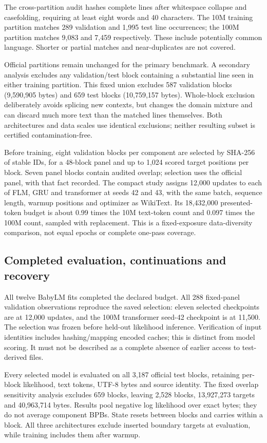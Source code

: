 \documentclass[10pt]{article}
\begin{document}
The cross-partition audit hashes complete lines after whitespace collapse and casefolding, requiring at least eight words and 40 characters. The 10M training partition matches 289 validation and 1,995 test line occurrences; the 100M partition matches 9,083 and 7,459 respectively. These include potentially common language. Shorter or partial matches and near-duplicates are not covered.

Official partitions remain unchanged for the primary benchmark. A secondary analysis excludes any validation/test block containing a substantial line seen in either training partition. This fixed union excludes 587 validation blocks (9,590,905 bytes) and 659 test blocks (10,759,157 bytes). Whole-block exclusion deliberately avoids splicing new contexts, but changes the domain mixture and can discard much more text than the matched lines themselves. Both architectures and data scales use identical exclusions; neither resulting subset is certified contamination-free.

Before training, eight validation blocks per component are selected by SHA-256 of stable IDs, for a 48-block panel and up to 1,024 scored target positions per block. Seven panel blocks contain audited overlap; selection uses the official panel, with that fact recorded. The compact study assigns 12,000 updates to each of FLM, GRU and transformer at seeds 42 and 43, with the same batch, sequence length, warmup positions and optimizer as WikiText. Its 18,432,000 presented-token budget is about 0.99 times the 10M text-token count and 0.097 times the 100M count, sampled with replacement. This is a fixed-exposure data-diversity comparison, not equal epochs or complete one-pass coverage.

\subsection{Completed evaluation, continuations and recovery}
All twelve BabyLM fits completed the declared budget. All 288 fixed-panel
validation observations reproduce the saved selection: eleven selected
checkpoints are at 12,000 updates, and the 100M transformer seed-42 checkpoint
is at 11,500. The selection was frozen before held-out likelihood inference.
Verification of input identities includes hashing/mapping encoded caches;
this is distinct from model scoring. It must not be described as a complete
absence of earlier access to test-derived files.

Every selected model is evaluated on all 3,187 official test blocks, retaining
per-block likelihood, text tokens, UTF-8 bytes and source identity. The fixed
overlap sensitivity analysis excludes 659 blocks, leaving 2,528 blocks,
13,927,273 targets and 40,963,714 bytes. Results pool negative log likelihood
over exact bytes; they do not average component BPBs. State resets between
blocks and carries within a block. All three architectures exclude inserted
boundary targets at evaluation, while training includes them after warmup.
\end{document}
